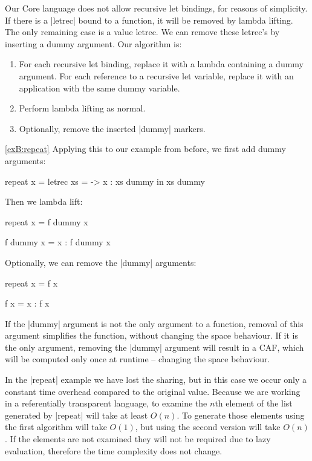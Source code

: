 Our Core language does not allow recursive let bindings, for reasons of simplicity. If there is a |letrec| bound to a function, it will be removed by lambda lifting. The only remaining case is a value letrec. We can remove these letrec's by inserting a dummy argument. Our algorithm is:

\begin{enumerate}
\item For each recursive let binding, replace it with a lambda containing a dummy argument. For each reference to a recursive let variable, replace it with an application with the same dummy variable.
\item Perform lambda lifting as normal.
\item Optionally, remove the inserted |dummy| markers.
\end{enumerate}

\begin{examplerevisit}{\ref{exB:repeat}}
Applying this to our example from before, we first add dummy arguments:

\begin{code}
repeat x =  letrec xs = \dummy ->  x : xs dummy
            in xs dummy
\end{code}

Then we lambda lift:

\begin{code}
repeat x = f dummy x

f dummy x = x : f dummy x
\end{code}

Optionally, we can remove the |dummy| arguments:

\begin{code}
repeat x = f x

f x = x : f x
\end{code}
\end{examplerevisit}

If the |dummy| argument is not the only argument to a function, removal of this argument simplifies the function, without changing the space behaviour. If it is the only argument, removing the |dummy| argument will result in a CAF, which will be computed only once at runtime -- changing the space behaviour.

In the |repeat| example we have lost the sharing, but in this case we occur only a constant time overhead compared to the original value. Because we are working in a referentially transparent language, to examine the $n$th element of the list generated by |repeat| will take at least $O(n)$. To generate those elements using the first algorithm will take $O(1)$, but using the second version will take $O(n)$. If the elements are not examined they will not be required due to lazy evaluation, therefore the time complexity does not change.

